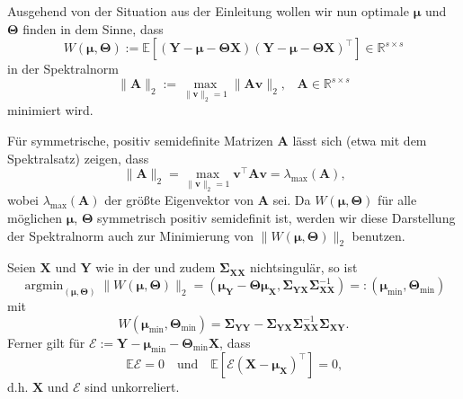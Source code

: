 \documentclass[]{article}
\newcommand{\E}{\mathbb{E}}
\newcommand{\R}{\mathbb{R}}
\newcommand{\X}{\mathbf{X}}
\newcommand{\Y}{\mathbf{Y}}
\newcommand{\T}{\mathbf{\Theta}}
\newcommand{\muu}{\bm{\mu}}
\newcommand{\Ssigma}{\mathbf{\Sigma}}
\newcommand{\vv}{\mathbf{v}}
\DeclareMathOperator*{\argmin}{argmin}
\begin{document}
Ausgehend von der Situation aus der Einleitung wollen wir nun optimale $\muu$ und $\T$ finden in dem Sinne, dass
$$W(\muu, \T) := \E[(\Y - \muu - \T \X)(\Y - \muu - \T \X)^\top] \in \R^{s \times s}$$ in der Spektralnorm
$$ \| \mathbf{A} \|_2 := \max_{\| \vv \|_2 = 1} \| \mathbf{A} \vv \|_2 \text{,} \quad \mathbf{A} \in \R^{s \times s} $$ 
minimiert wird.

Für symmetrische, positiv semidefinite Matrizen $\mathbf{A}$ lässt sich (etwa mit dem Spektralsatz) zeigen, dass
$$ \| \mathbf{A} \|_2 = \max_{\| \vv \|_2 = 1} \vv^\top \mathbf{A} \vv = \lambda_{\max} (\mathbf{A}) \text{,} $$
wobei $\lambda_{\max} (\mathbf{A})$ der größte Eigenvektor von $\mathbf{A}$ sei. Da $W(\muu, \T)$ für alle möglichen $\muu$, $\T$ symmetrisch
positiv semidefinit ist, werden wir diese Darstellung der Spektralnorm auch zur Minimierung von $\| W(\muu, \T) \|_2$  benutzen.

\begin{theorem}
	\label{thm:mr}
	Seien $\X$ und $\Y$ wie in der  und zudem $\Ssigma_{\X\X}$ nichtsingulär, so ist
	$$ \argmin_{(\muu, \T)} \| W(\muu, \T) \|_2 = (\muu_\Y - \T \muu_\X, \Ssigma_{\Y\X} \Ssigma_{\X\X}^{-1}) =: (\muu_{\min}, \T_{\min}) $$
	mit 
	$$W(\muu_{\min}, \T_{\min}) = \Ssigma_{\Y\Y} - \Ssigma_{\Y\X} \Ssigma_{\X\X}^{-1} \Ssigma_{\X\Y} \text{.}$$
	Ferner gilt für $\mathcal{E} := \Y - \muu_{\min} - \T_{\min} \X$, dass 
	$$\E \mathcal{E} = 0 \quad \text{und} \quad \E[\mathcal{E}(\X - \muu_\X)^\top] = 0 \text{,}$$
	d.h. $\X$ und $\mathcal{E}$ sind unkorreliert.
\end{theorem} 
\end{document}
